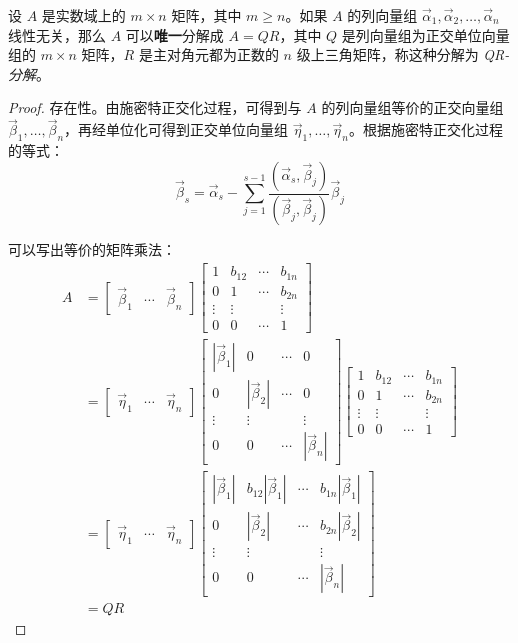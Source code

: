 \begin{theorem}[QR-分解]
	设 $A$ 是实数域上的 $m \times n$ 矩阵，其中 $m \ge n$。如果 $A$ 的列向量组 $\vec \alpha_1, \vec \alpha_2, \ldots, \vec \alpha_n$ 线性无关，那么 $A$ 可以\textbf{唯一}分解成 $A = QR$，其中 $Q$ 是列向量组为正交单位向量组的 $m \times n$ 矩阵，$R$ 是主对角元都为正数的 $n$ 级上三角矩阵，称这种分解为 \emph{QR-分解}。
\end{theorem}

\begin{proof}
	存在性。由施密特正交化过程，可得到与 $A$ 的列向量组等价的正交向量组 $\vec \beta_1, \ldots, \vec \beta_n$，再经单位化可得到正交单位向量组 $\vec \eta_1, \ldots, \vec \eta_n$。根据施密特正交化过程的等式：
	$$
	\vec \beta_s = \vec \alpha_s - \sum\limits_{j = 1}^{s - 1} \dfrac{(\vec \alpha_s, \vec \beta_j)}{(\vec \beta_j, \vec \beta_j)} \vec \beta_j
	$$

	可以写出等价的矩阵乘法：
	$$
	\begin{aligned}
	A &=
	\begin{bmatrix} \vec \beta_1 & \cdots & \vec \beta_n \end{bmatrix}
	\begin{bmatrix}
		1 & b_{12} & \cdots & b_{1n}
		\\
		0 & 1 & \cdots & b_{2n}
		\\
		\vdots & \vdots & & \vdots
		\\
		0 & 0 & \cdots & 1
	\end{bmatrix}
	\\&=
	\begin{bmatrix} \vec \eta_1 & \cdots & \vec \eta_n \end{bmatrix}
	\begin{bmatrix}
		|\vec \beta_1| & 0 & \cdots & 0
		\\
		0 & |\vec \beta_2| & \cdots & 0
		\\
		\vdots & \vdots & & \vdots
		\\
		0 & 0 & \cdots & |\vec \beta_n|
	\end{bmatrix}
	\begin{bmatrix}
		1 & b_{12} & \cdots & b_{1n}
		\\
		0 & 1 & \cdots & b_{2n}
		\\
		\vdots & \vdots & & \vdots
		\\
		0 & 0 & \cdots & 1
	\end{bmatrix}
	\\&=
	\begin{bmatrix} \vec \eta_1 & \cdots & \vec \eta_n \end{bmatrix}
	\begin{bmatrix}
		|\vec \beta_1| & b_{12}|\vec \beta_1| & \cdots & b_{1n}|\vec \beta_1|
		\\
		0 & |\vec \beta_2| & \cdots & b_{2n}|\vec \beta_2|
		\\
		\vdots & \vdots & & \vdots
		\\
		0 & 0 & \cdots & |\vec \beta_n|
	\end{bmatrix}
	\\&=
	QR
	\end{aligned}
	$$


\end{proof}
